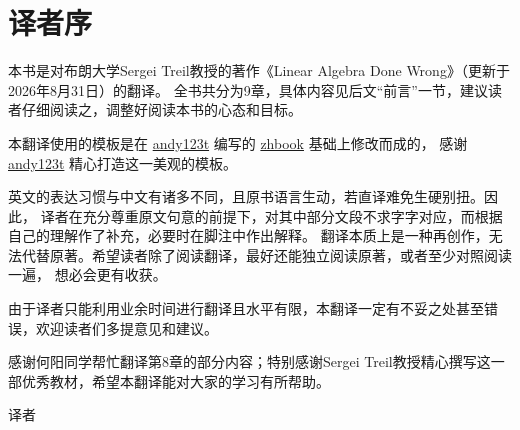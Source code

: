 
\chapter*{译者序}
本书是对布朗大学Sergei Treil教授的著作《Linear Algebra Done Wrong》（更新于2026年8月31日）的翻译。
全书共分为9章，具体内容见后文“前言”一节，建议读者仔细阅读之，调整好阅读本书的心态和目标。

本翻译使用的模板是在 \href{https://github.com/andy123t}{andy123t} 编写的 \href{https://github.com/andy123t/zhbook}{zhbook} 基础上修改而成的，
感谢 \href{https://github.com/andy123t}{andy123t} 精心打造这一美观的模板。

英文的表达习惯与中文有诸多不同，且原书语言生动，若直译难免生硬别扭。因此，
译者在充分尊重原文句意的前提下，对其中部分文段不求字字对应，而根据自己的理解作了补充，必要时在脚注中作出解释。
翻译本质上是一种再创作，无法代替原著。希望读者除了阅读翻译，最好还能独立阅读原著，或者至少对照阅读一遍，
想必会更有收获。

由于译者只能利用业余时间进行翻译且水平有限，本翻译一定有不妥之处甚至错误，欢迎读者们多提意见和建议。

感谢何阳同学帮忙翻译第8章的部分内容；特别感谢Sergei Treil教授精心撰写这一部优秀教材，希望本翻译能对大家的学习有所帮助。


{\hfill 译者}

